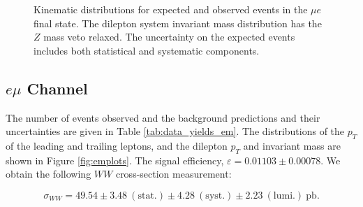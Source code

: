 \begin{figure}[!hbtp]
\begin{center}
\caption{Kinematic distributions for expected and observed events in the $\mu{e}$ final state.
The dilepton system invariant mass distribution has the $Z$ mass veto relaxed.
The uncertainty on the expected events includes both statistical and systematic components.}
\label{fig:meplots}
\end{center}
\end{figure}

%
%
%
\clearpage
\subsection{$e \mu$ Channel}

The number of events observed and the background predictions and their uncertainties are
given in Table \ref{tab:data_yields_em}.
The distributions of the $p_{T}$ of the leading and trailing leptons, and the dilepton $p_{T}$
and invariant mass are shown in Figure \ref{fig:emplots}.
The signal efficiency,  $\varepsilon = 0.01103 \pm 0.00078$.
We obtain the following $WW$ cross-section measurement:

\begin{equation*}
\sigma_{WW}  = 49.54 \pm 3.48~\mathrm{(stat.)} \pm 4.28~\mathrm{(syst.)} \pm 2.23~\mathrm{(lumi.)~pb}. 
\end{equation*}

